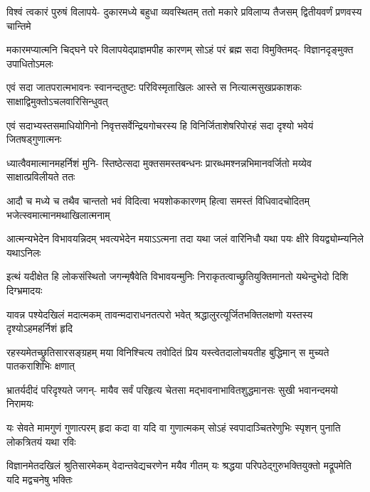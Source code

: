 \fourlineindentedshloka
{विश्वं त्वकारं पुरुषं विलापये-}
{दुकारमध्ये बहुधा व्यवस्थितम्}
{ततो मकारे प्रविलाप्य तैजसम्}
{द्वितीयवर्णं प्रणवस्य चान्तिमे} %

\fourlineindentedshloka
{मकारमप्यात्मनि चिद्घने परे}
{विलापयेद्प्राज्ञमपीह कारणम्}
{सोऽहं परं ब्रह्म सदा विमुक्तिमद्-}
{विज्ञानदृङ्मुक्त उपाधितोऽमलः} %

\fourlineindentedshloka
{एवं सदा जातपरात्मभावनः}
{स्वानन्दतुष्टः परिविस्मृताखिलः}
{आस्ते स नित्यात्मसुखप्रकाशकः}
{साक्षाद्विमुक्तोऽचलवारिसिन्धुवत्} %

\fourlineindentedshloka
{एवं सदाभ्यस्तसमाधियोगिनो}
{निवृत्तसर्वेन्द्रियगोचरस्य हि}
{विनिर्जिताशेषरिपोरहं सदा}
{दृश्यो भवेयं जितषड्गुणात्मनः} %

\fourlineindentedshloka
{ध्यात्वैवमात्मानमहर्निशं मुनि-}
{स्तिष्ठेत्सदा मुक्तसमस्तबन्धनः}
{प्रारब्धमश्नन्नभिमानवर्जितो}
{मय्येव साक्षात्प्रविलीयते ततः} %

\fourlineindentedshloka
{आदौ च मध्ये च तथैव चान्ततो}
{भवं विदित्वा भयशोककारणम्}
{हित्वा समस्तं विधिवादचोदितम्}
{भजेत्स्वमात्मानमथाखिलात्मनाम्} %

\fourlineindentedshloka
{आत्मन्यभेदेन विभावयन्निदम्}
{भवत्यभेदेन मयाऽऽत्मना तदा}
{यथा जलं वारिनिधौ यथा पयः}
{क्षीरे वियद्व्योम्न्यनिले यथाऽनिलः} %

\fourlineindentedshloka
{इत्थं यदीक्षेत हि लोकसंस्थितो}
{जगन्मृषैवेति विभावयन्मुनिः}
{निराकृतत्वाच्छ्रुतियुक्तिमानतो}
{यथेन्दुभेदो दिशि दिग्भ्रमादयः} %

\fourlineindentedshloka
{यावन्न पश्येदखिलं मदात्मकम्}
{तावन्मदाराधनतत्परो भवेत्}
{श्रद्धालुरत्यूर्जितभक्तिलक्षणो}
{यस्तस्य दृश्योऽहमहर्निशं हृदि} %

\fourlineindentedshloka
{रहस्यमेतच्छ्रुतिसारसङ्ग्रहम्}
{मया विनिश्चित्य तवोदितं प्रिय}
{यस्त्वेतदालोचयतीह बुद्धिमान्}
{स मुच्यते पातकराशिभिः क्षणात्} %

\fourlineindentedshloka
{भ्रातर्यदीदं परिदृश्यते जगन्-}
{मायैव सर्वं परिहृत्य चेतसा}
{मद्भावनाभावितशुद्धमानसः}
{सुखी भवानन्दमयो निरामयः} %

\fourlineindentedshloka
{यः सेवते मामगुणं गुणात्परम्}
{हृदा कदा वा यदि वा गुणात्मकम्}
{सोऽहं स्वपादाञ्चितरेणुभिः स्पृशन्}
{पुनाति लोकत्रितयं यथा रविः} %

\fourlineindentedshloka
{विज्ञानमेतदखिलं श्रुतिसारमेकम्}
{वेदान्तवेद्यचरणेन मयैव गीतम्}
{यः श्रद्धया परिपठेद्गुरुभक्तियुक्तो}
{मद्रूपमेति यदि मद्वचनेषु भक्तिः} %




